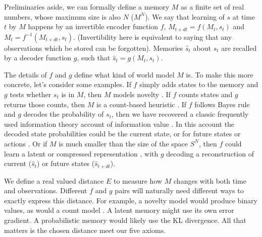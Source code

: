 \documentclass[12pt]{article}
\begin{document}
Preliminaries aside, we can formally define a memory $M$ as a finite set of real numbers, whose maximum size is also $N$ ($M^N$). We say that learning of $s$ at time $t$ by $M$ happens by an invertible encoder function $f$, $M_{t+dt} = f(M_{t}, s_{t})$ and $M_{t} = f^{-1}(M_{t+dt}, s_{t})$. (Invertibility here is equivalent to saying that any observations which be stored can be forgotten). Memories $\hat s_t$ about $s_t$ are recalled by a decoder function $g$, such that $\hat s_t = g(M_t, s_t)$. 

The details of $f$ and $g$ define what kind of world model $M$ is. To make this more concrete, let's consider some examples. If $f$ simply adds states to the memory and $g$ tests whether $s_t$ is in $M$, then $M$ models novelty \cite{Kakade2002}. If $f$ counts states and $g$ returns those counts, then $M$ is a count-based heuristic \cite{Bellemare2016,Dayan1993}. If $f$ follows Bayes rule and $g$ decodes the probability of $s_t$, then we have recovered a classic frequently used information theory account of information value \cite{Itti2009,Friston2016,Tenenbaum2006}. In this account the decoded state probabilities could be the current state, or for future states or actions \cite{Schmidhuber1991,Pathak2017,Friston2016}. Or if $M$ is much smaller than the size of the space $S^N$, then $f$ could learn a latent or compressed representation \cite{Kingma2013,Schmidhuber2008,Levi-Aharoni2019,Ganguli2010,Ha2018,Schmidhuber2015a,Mante2013,Park2017}, with $g$ decoding a reconstruction of current ($\hat s_t$) or future states ($\hat s_{t+dt}$).

We define a real valued distance $E$ to measure how $M$ changes with both time and observations. Different $f$ and $g$ pairs will naturally need different ways to exactly express this distance. For example, a novelty model \cite{Kakade2002} would produce binary values, as would a count model \cite{Bellemare2016,Dayan1993}. A latent memory \cite{Schmidhuber1991,Pathak2017} might use its own error gradient. A probabilistic memory \cite{Park2017,Friston2016} would likely use the KL divergence. All that matters is the chosen distance meet our five axioms. 
\end{document}
